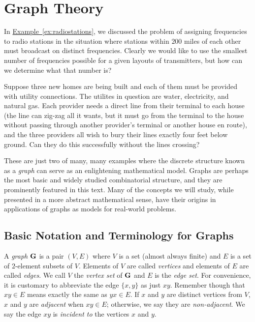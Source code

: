 
\chapter{Graph Theory}\label{ch:graphs}

In \hyperref[ex:radiostations]{Example~\ref*{ex:radiostations}}, we
discussed the problem of assigning frequencies to radio stations in
the situation where stations within $200$ miles of each other must
broadcast on distinct frequencies. Clearly we would like to use the
smallest number of frequencies possible for a given layouts of
transmitters, but how can we determine what that number is?

Suppose three new homes are being built and each of them must be
provided with utility connections. The utilites in question are water,
electricity, and natural gas. Each provider needs a direct line from
their terminal to each house (the line can zig-zag all it wants, but
it must go from the terminal to the house without passing through
another provider's terminal or another house en route), and the three
providers all wish to bury their lines exactly four feet below
ground. Can they do this successfully without the lines crossing?

These are just two of many, many examples where the discrete structure
known as a \emph{graph} can serve as an enlightening mathematical
model. Graphs are perhaps the most basic and widely studied
combinatorial structure, and they are prominently featured in this
text. Many of the concepts we will study, while presented in a more
abstract mathematical sense, have their origins in applications of
graphs as models for real-world problems.

\section{Basic Notation and Terminology for Graphs}\label{s:graphs:intro}

A \textit{graph} $\mathbf{G}$ is a pair $(V,E)$ where $V$ is a set (almost
always finite) and $E$ is a set of $2$-element subsets of $V$.
Elements of $V$ are called \textit{vertices} and elements of $E$ are
called \textit{edges}.  We call $V$ the \textit{vertex set} of $\mathbf{G}$
and $E$ is the \textit{edge set}.  For convenience, it is customary to
abbreviate the edge $\{x,y\}$ as just $xy$.  Remember though that
$xy\in E$ means exactly the same as $yx\in E$.  If $x$ and $y$ are
distinct vertices from $V$, $x$ and $y$ are \textit{adjacent} when
$xy\in E$; otherwise, we say they are \textit{non-adjacent}. We say
the edge $xy$ is \emph{incident to} the vertices $x$ and $y$.

